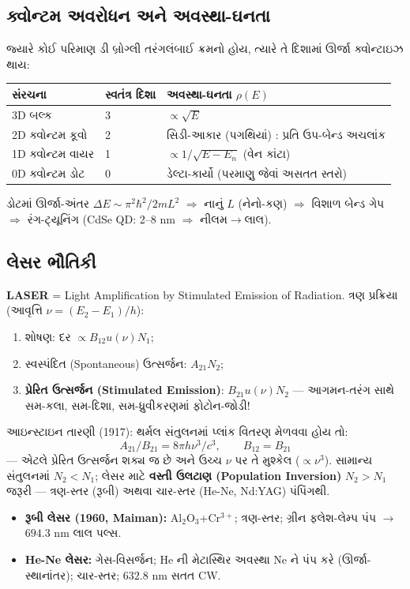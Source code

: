 \subsection{ક્વોન્ટમ અવરોધન અને અવસ્થા-ઘનતા }
જ્યારે કોઈ પરિમાણ ડી બ્રોગ્લી તરંગલંબાઈ ક્રમનો હોય, ત્યારે તે દિશામાં ઊર્જા ક્વોન્ટાઇઝ થાય:
\begin{center}
\begin{tabular}{@{}lll@{}}
\toprule
સંરચના & સ્વતંત્ર દિશા & અવસ્થા-ઘનતા $\rho(E)$ \\
\midrule
3D બલ્ક & 3 & $\propto\sqrt{E}$ \\
2D ક્વોન્ટમ કૂવો & 2 & સિડી-આકાર (પગથિયાં) : પ્રતિ ઉપ-બેન્ડ અચલાંક \\
1D ક્વોન્ટમ વાયર & 1 & $\propto1/\sqrt{E-E_n}$ (વેન કાંટા) \\
0D ક્વોન્ટમ ડોટ & 0 & ડેલ્ટા-કાર્યો (પરમાણુ જેવાં અસતત સ્તરો) \\
\bottomrule
\end{tabular}
\end{center}
ડોટમાં ઊર્જા-અંતર $\Delta E\sim\pi^2\hbar^2/2mL^2$ $\Rightarrow$ નાનું $L$ (નેનો-કણ) $\Rightarrow$ વિશાળ બેન્ડ ગેપ $\Rightarrow$ રંગ-ટ્યૂનિંગ (CdSe QD: 2–8 nm $\Rightarrow$ નીલમ$\to$લાલ).

\subsection{લેસર ભૌતિકી }
\textbf{LASER} = Light Amplification by Stimulated Emission of Radiation. ત્રણ પ્રક્રિયા (આવૃત્તિ $\nu=(E_2-E_1)/h$):
\begin{enumerate}[label=(\alph*)]
  \item શોષણ: દર $\propto B_{12}u(\nu)N_1$;
  \item સ્વસ્પંદિત (Spontaneous) ઉત્સર્જન: $A_{21}N_2$;
  \item \textbf{પ્રેરિત ઉત્સર્જન (Stimulated Emission)}: $B_{21}u(\nu)N_2$ — આગમન-તરંગ સાથે સમ-કલા, સમ-દિશા, સમ-ધ્રુવીકરણમાં ફોટોન-જોડી!
\end{enumerate}
આઇન્સ્ટાઇન તારણી (1917): થર્મલ સંતુલનમાં પ્લાંક વિતરણ મેળવવા હોય તો:
\begin{equation}
A_{21}/B_{21}=8\pi h\nu^{3}/c^{3},\qquad B_{12}=B_{21}
\label{eq:einsteinAB}
\end{equation}
— એટલે પ્રેરિત ઉત્સર્જન શક્ય જ છે અને ઉચ્ચ $\nu$ પર તે મુશ્કેલ ($\propto\nu^3$).
સામાન્ય સંતુલનમાં $N_2<N_1$; લેસર માટે \textbf{વસ્તી ઉલટાણ (Population Inversion)} $N_2>N_1$ જરૂરી — ત્રણ-સ્તર (રૂબી) અથવા ચાર-સ્તર (He-Ne, Nd:YAG) પંપિંગથી.
\begin{itemize}[itemsep=2pt]
  \item \textbf{રૂબી લેસર (1960, Maiman):} Al$_2$O$_3$+Cr$^{3+}$; ત્રણ-સ્તર; ગ્રીન ફ્લેશ-લેમ્પ પંપ $\to$ $694.3$ nm લાલ પલ્સ.
  \item \textbf{He-Ne લેસર:} ગેસ-વિસર્જન; He ની મેટાસ્થિર અવસ્થા Ne ને પંપ કરે (ઊર્જા-સ્થાનાંતર); ચાર-સ્તર; $632.8$ nm સતત CW.
\end{itemize}


